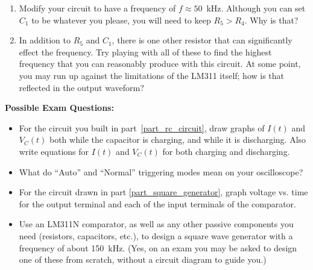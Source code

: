 \begin{enumerate}[wide]
\item Modify your circuit to have a frequency of $f \approx 50$~kHz. Although you can set $C_1$ to be whatever you please, you will need to keep $R_5 > R_4$.  Why is that?

\pagebreak[3]
\item In addition to $R_5$ and $C_1$, there is one other resistor that can significantly effect the frequency.  Try playing with all of these to find the highest frequency that you can reasonably produce with this circuit.  At some point, you may run up against the limitations of the LM311 itself; how is that reflected in the output waveform? 
\end{enumerate}

\textbf{Possible Exam Questions:}

\begin{itemize}


\item For the circuit you built in part~\ref{part_rc_circuit}, draw graphs of $I(t)$ and $V_C(t)$ both while the capacitor is charging, and while it is discharging.  Also write equations for $I(t)$ and $V_C(t)$ for both charging and discharging.

\item What do ``Auto'' and ``Normal'' triggering modes mean on your oscilloscope?

\item For the circuit drawn in part \ref{part_square_generator}, graph voltage vs. time for the output terminal and each of the input terminals of the comparator.


\item Use an LM311N comparator, as well as any other passive components you need (resistors, capacitors, etc.), to design a square wave generator with a frequency of about 150~kHz.  (Yes, on an exam you may be asked to design one of these from scratch, without a circuit diagram to guide you.)

\end{itemize}

